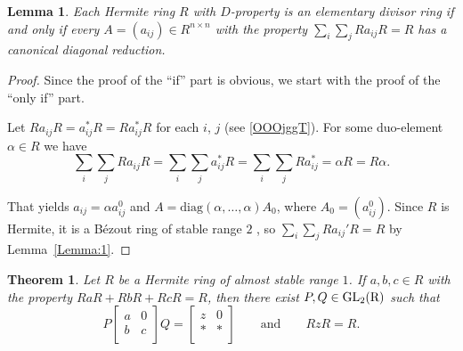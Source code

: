 \documentclass[12pt,a4paper, reqno]{amsart}
\def\GL{\rm GL}
\newtheorem{theorem}{Theorem}
\newtheorem{lemma}{Lemma}
\begin{document}


\begin{lemma}\label{Lemma:3}
Each  Hermite ring  $R$ with   $D$-property  is an elementary divisor ring if and only if every  $A=(a_{ij})\in R^{n\times n}$ with the property   $\sum\limits_{i}\sum\limits_{j} Ra_{ij}R=R$ has a canonical diagonal reduction.
\end{lemma}

\begin{proof} Since the proof of the ``if'' part  is obvious, we start with the proof of the ``only if'' part.

Let $Ra_{ij}R= a_{ij}^*R= Ra_{ij}^*R$ for  each $i$, $j$ (see \eqref{OOOjggT}). For some duo-element $\alpha\in R$ we have
\[
\sum\limits_{i}\sum\limits_{j} Ra_{ij}R=\sum\limits_{i}\sum\limits_{j} a_{ij}^*R=\sum\limits_{i}\sum\limits_{j} Ra_{ij}^*=\alpha R=R\alpha.
\]

That yields  $a_{ij}=\alpha a_{ij}^0$ and $ A=\mathrm{diag}(\alpha,\dots,\alpha)A_0$, where $A_0= (a_{ij}^0)$.
Since $R$ is Hermite, it  is a B\'ezout ring of stable range $2$ \cite[p.\,30, Collorarly $2$.1.3, Theorem $1$.2.40]{12-zabavsky}, so  $\sum_i\sum_jRa_{ij}'R=R$ by Lemma~\ref{Lemma:1}.
\end{proof}



\begin{theorem}\label{T:12}
Let $R$ be a Hermite ring of almost stable range $1$.  If $a,b,c\in R$ with the property  $RaR+RbR+RcR=R$, then there exist $P, Q\in \GL_{2}(R)$ such that
\[
P\left[
\begin{array}{cc}
a & 0 \\
b & c\\
\end{array}\right]Q=\left[
\begin{array}{cc}
z & 0 \\
* & *\\
\end{array}
\right]\qquad \text{and}\qquad   RzR=R.
\]
\end{theorem}
\end{document}
